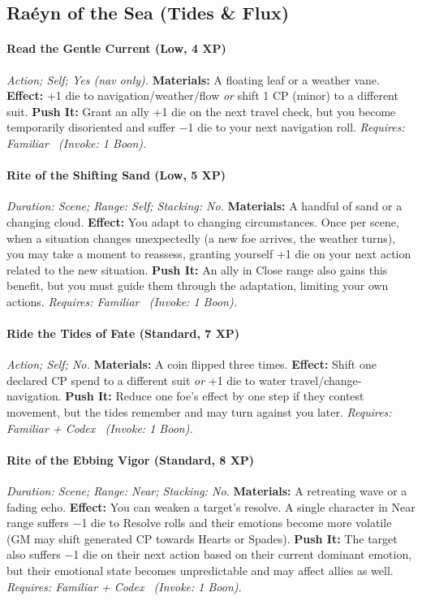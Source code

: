 \documentclass[12pt,twoside]{book}
\begin{document}
\subsection{Raéyn of the Sea (Tides \& Flux)}
\paragraph{Read the Gentle Current (Low, 4 XP)} \emph{Action; Self; Yes (nav only).}
\textbf{Materials:} A floating leaf or a weather vane.
\textbf{Effect:} +1 die to navigation/weather/flow \emph{or} shift 1 CP (minor) to a different suit.
\textbf{Push It:} Grant an ally +1 die on the next travel check, but you become temporarily disoriented and suffer −1 die to your next navigation roll.
\emph{Requires: Familiar \ (\textit{Invoke:} 1 Boon).}
\paragraph{Rite of the Shifting Sand (Low, 5 XP)} \emph{Duration: Scene; Range: Self; Stacking: No.}
\textbf{Materials:} A handful of sand or a changing cloud.
\textbf{Effect:} You adapt to changing circumstances. Once per scene, when a situation changes unexpectedly (a new foe arrives, the weather turns), you may take a moment to reassess, granting yourself +1 die on your next action related to the new situation.
\textbf{Push It:} An ally in Close range also gains this benefit, but you must guide them through the adaptation, limiting your own actions.
\emph{Requires: Familiar \ (\textit{Invoke:} 1 Boon).}
\paragraph{Ride the Tides of Fate (Standard, 7 XP)} \emph{Action; Self; No.}
\textbf{Materials:} A coin flipped three times.
\textbf{Effect:} Shift one declared CP spend to a different suit \emph{or} +1 die to water travel/change-navigation.
\textbf{Push It:} Reduce one foe's effect by one step if they contest movement, but the tides remember and may turn against you later.
\emph{Requires: Familiar + Codex \ (\textit{Invoke:} 1 Boon).}
\paragraph{Rite of the Ebbing Vigor (Standard, 8 XP)} \emph{Duration: Scene; Range: Near; Stacking: No.}
\textbf{Materials:} A retreating wave or a fading echo.
\textbf{Effect:} You can weaken a target's resolve. A single character in Near range suffers −1 die to Resolve rolls and their emotions become more volatile (GM may shift generated CP towards Hearts or Spades).
\textbf{Push It:} The target also suffers −1 die on their next action based on their current dominant emotion, but their emotional state becomes unpredictable and may affect allies as well.
\emph{Requires: Familiar + Codex \ (\textit{Invoke:} 1 Boon).}
\end{document}
